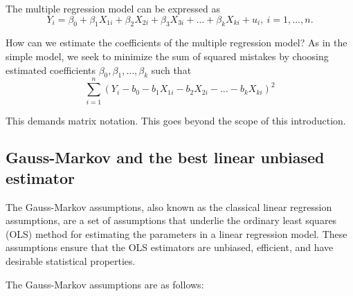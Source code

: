 \documentclass[
  12pt,
  oneside]{book}
\theoremstyle{definition}
\theoremstyle{definition}
\theoremstyle{definition}
\theoremstyle{definition}
\theoremstyle{remark}
\begin{document}
The multiple regression model can be expressed as
\[
Y_i = \beta_0 + \beta_1 X_{1i} + \beta_2 X_{2i} + \beta_3 X_{3i} + \dots + \beta_k X_{ki} + u_i, \ i=1,\dots,n.
\]

How can we estimate the coefficients of the multiple regression model? As in the simple model, we seek to minimize the sum of squared mistakes by choosing estimated
coefficients \(\beta_0,\beta_1,\dots,\beta_k\) such that
\[\sum_{i=1}^n (Y_i - b_0 - b_1 X_{1i} - b_2 X_{2i} - \dots -  b_k X_{ki})^2 \]

This demands matrix notation. This goes beyond the scope of this introduction.

\hypertarget{gauss-markov-and-the-best-linear-unbiased-estimator}{%
\subsection{Gauss-Markov and the best linear unbiased estimator}\label{gauss-markov-and-the-best-linear-unbiased-estimator}}

The Gauss-Markov assumptions, also known as the classical linear regression assumptions, are a set of assumptions that underlie the ordinary least squares (OLS) method for estimating the parameters in a linear regression model. These assumptions ensure that the OLS estimators are unbiased, efficient, and have desirable statistical properties.

The Gauss-Markov assumptions are as follows:
\end{document}
